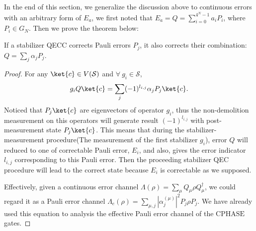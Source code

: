 \documentclass[11pt]{article}
\begin{document}
In the end of this section, we generalize the discussion above to continuous errors with an arbitrary form of $E_a$, we first noted that $E_a=Q =\sum_{i = 0}^{4^N - 1} a_i P_i $, where $P_i \in G_N$.
Then we prove the theorem below:
\begin{theorem}\label{theorem:continous_to_Pauli}
    If a stabilizer QECC corrects Pauli errors $P_j$, it also corrects their combination: $Q = \sum_j \alpha_j P_j$. 
\end{theorem}
\begin{proof}
    For any $\ket{c} \in V(\mathcal{S})$ and $\forall~g_i \in \mathcal{S}$, 
    \begin{align}
        g_i Q \ket{c} = \sum_j (-1)^{l_{i,j}} \alpha_j P_j \ket{c}.
    \end{align}
    Noticed that $P_j\ket{c}$ are eigenvectors of operator $g_i$, thus the non-demolition measurement on this operators will generate result $(-1)^{l_{i,j}}$ with post-measurement state $P_j\ket{c}$. This means that during the stabilizer-measurement procedure(The measurement of the first stabilizer $g_i$), error $Q$ will reduced to one of correctable Pauli error, $E_i$, and also, gives the error indicator $l_{i,j}$ corresponding to this Pauli error. Then the proceeding stabilizer QEC procedure will lead to the correct state because $E_i$ is correctable as we supposed.

    Effectively, given a continuous error channel $\Lambda(\rho) = \sum_\mu Q_\mu \rho Q_{\mu}^\dagger$,  we could regard it as a Pauli error channel $\Lambda_e(\rho) = \sum_{\mu,j}|\alpha_j^{(\mu)}|^2 P_j \rho P_j$. We have already used this equation to analysis the effective Pauli error channel of the $\text{CPHASE}$ gates.  
\end{proof}
\end{document}
